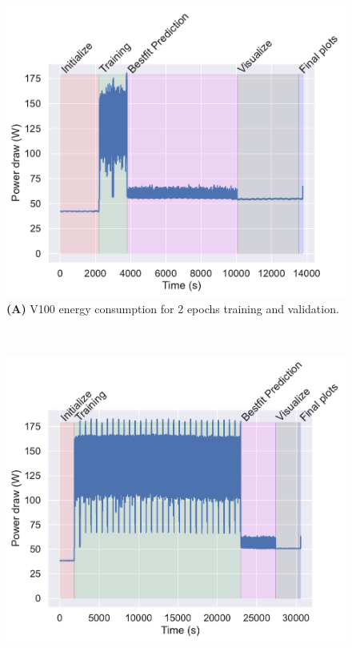 \documentclass[utf8]{FrontiersinVancouver} %
\begin{document}
\begin{figure}[p]

  \begin{center}
     \begin{minipage}[t]{0.30\textwidth}
        \includegraphics[width=1.0\linewidth]{images/v100-shaded-energy-2-epochs}
        {\bf (A)} V100 energy consumption for 2 epochs training and validation.
     \end{minipage}
     \ \
     \begin{minipage}[t]{0.30\textwidth}
        \includegraphics[width=1.0\linewidth]{images/v100-shaded-energy-30-epochs}

\end{minipage}
\end{center}
\end{figure}
\end{document}
